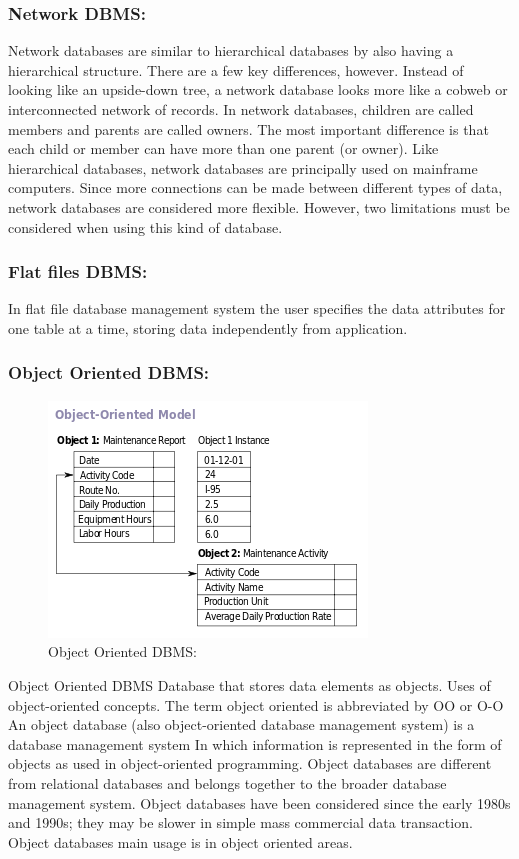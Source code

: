 \documentclass[14pt]{article} %
\begin{document}
\subsubsection{\textbf{Network DBMS: }}
    Network databases are similar to hierarchical databases by also having a hierarchical structure. There are a few key differences, however. Instead of looking like an upside-down tree, a network database looks more like a cobweb or interconnected network of records. In network databases, children are called members and parents are called owners. The most important difference is that each child or member can have more than one parent (or owner). 
Like hierarchical databases, network databases are principally used on mainframe computers. Since more connections can be made between different types of data, network databases are considered more flexible. However, two limitations must be considered when using this kind of database.



\subsubsection{\textbf{Flat files DBMS:}}
 In flat file database management system the user specifies the data attributes for one table at a time, storing data independently from application.
 
\subsubsection{\textbf{Object Oriented DBMS:}}
 \begin{figure}[H]
 \centering
   \includegraphics[width=0.8\linewidth]{object.png}
  \caption{Object Oriented DBMS:}
  \label{fig:figure 14}
\end{figure}
Object Oriented DBMS Database that stores data elements as objects. Uses of object-oriented concepts. The term object oriented is abbreviated by OO or O-O
An object database (also object-oriented database management system) is a database management system 
In which information is represented in the form of objects as used in object-oriented programming. Object databases are different from relational databases and belongs together to the broader database management system.
Object databases have been considered since the early 1980s and 1990s; they may be slower in simple mass commercial data transaction. Object databases main usage is in object oriented areas. 
                         
\end{document}
